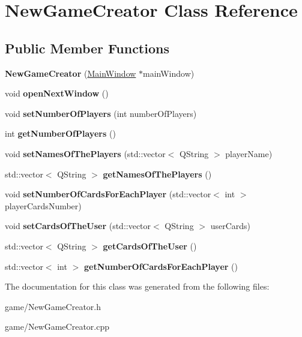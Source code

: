 \hypertarget{classNewGameCreator}{}\section{New\+Game\+Creator Class Reference}
\label{classNewGameCreator}
\subsection*{Public Member Functions}
\begin{DoxyCompactItemize}
\item 
\mbox{\label{classNewGameCreator_a30b53bdda90bbf9f9ce8183e6e475274}} 
{\bfseries New\+Game\+Creator} (\hyperlink{classMainWindow}{Main\+Window} $\ast$main\+Window)
\item 
\mbox{\label{classNewGameCreator_aa3cc740c81a3264a352a9cac2a2c60eb}} 
void {\bfseries open\+Next\+Window} ()
\item 
\mbox{\label{classNewGameCreator_a6118892cee025ca10e05741387ce999c}} 
void {\bfseries set\+Number\+Of\+Players} (int number\+Of\+Players)
\item 
\mbox{\label{classNewGameCreator_acc48dac51f9b7cf2b2b6793f321ce144}} 
int {\bfseries get\+Number\+Of\+Players} ()
\item 
\mbox{\label{classNewGameCreator_a753d5ed531a6d57ed1418a696c66ddb2}} 
void {\bfseries set\+Names\+Of\+The\+Players} (std\+::vector$<$ Q\+String $>$ player\+Name)
\item 
\mbox{\label{classNewGameCreator_a1aac05c21a10a7e4709c831ac6e56b91}} 
std\+::vector$<$ Q\+String $>$ {\bfseries get\+Names\+Of\+The\+Players} ()
\item 
\mbox{\label{classNewGameCreator_abff5d40e11ad39ab4356af6717d88e83}} 
void {\bfseries set\+Number\+Of\+Cards\+For\+Each\+Player} (std\+::vector$<$ int $>$ player\+Cards\+Number)
\item 
\mbox{\label{classNewGameCreator_a14244649f919d6946d33c518932105f3}} 
void {\bfseries set\+Cards\+Of\+The\+User} (std\+::vector$<$ Q\+String $>$ user\+Cards)
\item 
\mbox{\label{classNewGameCreator_ac2905e16676010c2989674a8e18e2d9b}} 
std\+::vector$<$ Q\+String $>$ {\bfseries get\+Cards\+Of\+The\+User} ()
\item 
\mbox{\label{classNewGameCreator_a6bdc7ce36cc5c1bf2952ddd0167e6681}} 
std\+::vector$<$ int $>$ {\bfseries get\+Number\+Of\+Cards\+For\+Each\+Player} ()
\end{DoxyCompactItemize}


The documentation for this class was generated from the following files\+:\begin{DoxyCompactItemize}
\item 
game/New\+Game\+Creator.\+h\item 
game/New\+Game\+Creator.\+cpp\end{DoxyCompactItemize}
